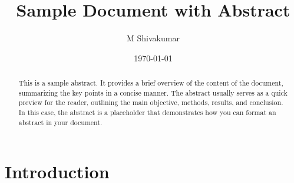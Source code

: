 \documentclass{article}
\begin{document}
 

\title{Sample Document with Abstract} 
\author{ M Shivakumar} %
\date{\today} %

\maketitle 

\begin{abstract} 
This is a sample abstract. It provides a brief overview of the content of the document,
summarizing the key points in a concise manner. The abstract usually serves as a quick 
preview for the reader, outlining the main objective, methods, results, and conclusion. 
In this case, the abstract is a placeholder that demonstrates how you can format an abstract
in your document. 
\end{abstract} 

\section{Introduction} 
\lipsum[1] %
\end{document}
